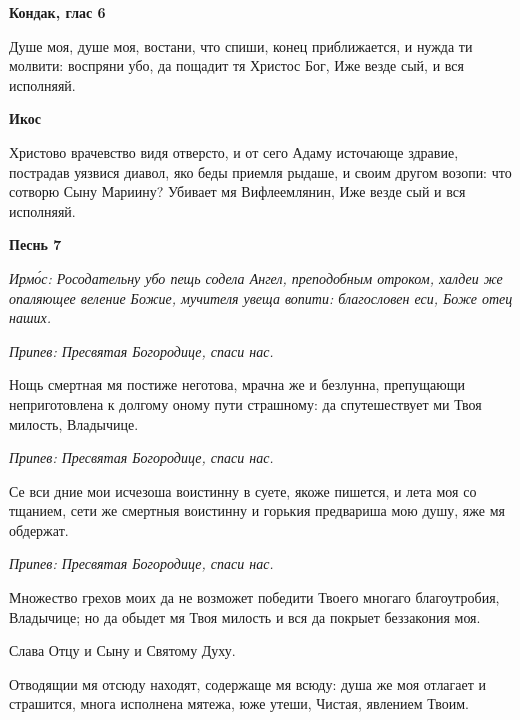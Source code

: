  

\bfseries Кондак, глас 6\normalfont{}


   Душе моя, душе моя, востани, что спиши, конец приближается, и нужда
ти молвити: воспряни убо, да пощадит тя Христос Бог, Иже везде сый, и вся
исполняяй.



 

\bfseries Икос\normalfont{}


   Христово врачевство видя отверсто, и от сего Адаму источающе здравие,
пострадав уязвися диавол, яко беды приемля рыдаше, и своим другом
возопи: что сотворю Сыну Мариину? Убивает мя Вифлеемлянин, Иже везде
сый и вся исполняяй.



 

\bfseries Песнь 7\normalfont{}


 \itshape Ирмо́с:\normalfont{} Росодательну убо пещь содела Ангел, преподобным отроком, халдеи же
опаляющее веление Божие, мучителя увеща вопити: благословен еси, Боже отец
наших.




 \itshape Припев:\normalfont{} Пресвятая Богородице, спаси нас.



   Нощь смертная мя постиже неготова, мрачна же и безлунна, препущающи
неприготовлена к долгому оному пути страшному: да спутешествует ми Твоя
милость, Владычице.



 \itshape Припев:\normalfont{} Пресвятая Богородице, спаси нас.



   Се вси дние мои исчезоша воистинну в суете, якоже пишется, и лета моя
со тщанием, сети же смертныя воистинну и горькия предвариша мою душу,
яже мя обдержат.



 \itshape Припев:\normalfont{} Пресвятая Богородице, спаси нас.



   Множество грехов моих да не возможет победити Твоего многаго
благоутробия, Владычице; но да обыдет мя Твоя милость и вся да покрыет
беззакония моя.



   Слава Отцу и Сыну и Святому Духу.



   Отводящии мя отсюду находят, содержаще мя всюду: душа же моя
отлагает и страшится, многа исполнена мятежа, юже утеши, Чистая,
явлением Твоим.



